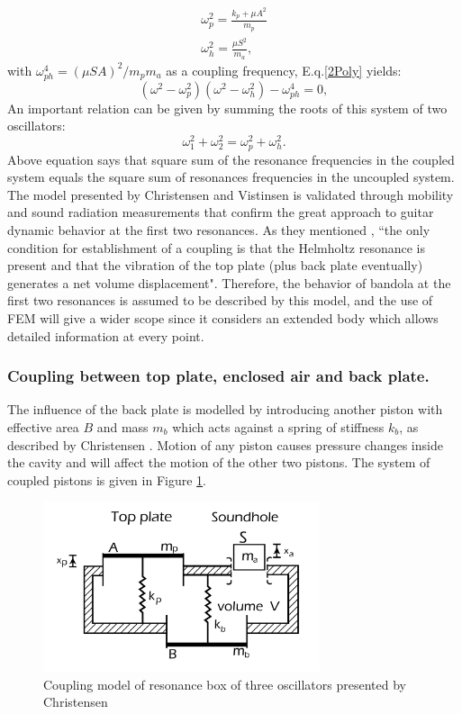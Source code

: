 \begin{eqnarray*}
\omega^2_p = \frac{k_p + \mu A^2}{m_p}\\
\omega^2_h = \frac{\mu S^2}{m_a},
\end{eqnarray*}
with $\omega^4_{ph}=(\mu SA)^2/m_p m_a$ as a coupling frequency, E.q.\ref{2Poly} yields:
\begin{equation}
(\omega^2 - \omega^2_p)(\omega^2 - \omega^2_h)- \omega^4_{ph} =0,
\end{equation}
An important relation can be given by summing the roots of this system of two oscillators:
\begin{equation}
\omega_{1}^2 + \omega_{2}^2 = \omega^2_p + \omega^2_h.
\label{Combination2}
\end{equation}
Above equation says that square sum of the resonance frequencies in the coupled system equals the square sum of resonances frequencies in the uncoupled system.\\

The model presented by Christensen and Vistinsen is validated through mobility and sound radiation measurements that confirm the great approach to guitar dynamic behavior at the first two resonances. As they mentioned \cite{Christensen}, ``the only condition for establishment of a coupling is that the Helmholtz resonance is present and that the vibration of the top plate (plus back plate eventually) generates a net volume displacement". Therefore, the behavior of bandola at the first two resonances is assumed to be described by this model, and the use of FEM will give a wider scope since it considers an extended body which allows detailed information at every point.

\subsubsection{Coupling between top plate, enclosed air and back plate.}

The influence of the back plate is modelled by introducing another piston with effective area $B$ and mass $m_b$ which acts against a spring of stiffness $k_b$, as described by Christensen \cite{Christensen3}. Motion of any piston causes pressure changes inside the cavity and will affect the motion of the other two pistons. The system of coupled pistons is given in Figure \ref{Top-Back-Air}.

\begin{figure}[h]
\centering
\includegraphics[height=5cm]{img/Top-Back-Air.png}
\caption{Coupling model of resonance box of three oscillators presented by Christensen}
\label{Top-Back-Air}
\end{figure}

